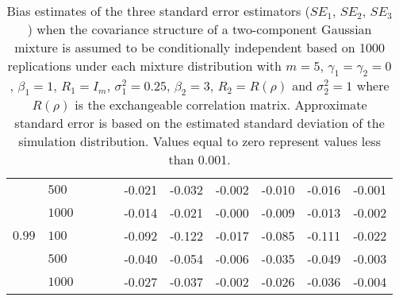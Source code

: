 \documentclass[10pt]{article}
\begin{document}
\begin{table}[ht]
\begin{center}
\begin{tabular}{llccccccccc}
    & $500$ &   &   &   & -0.021 & -0.032 & -0.002 & -0.010 & -0.016 & -0.001 \\ 
    & $1000$ &   &   &   & -0.014 & -0.021 & -0.000 & -0.009 & -0.013 & -0.002 \\ 
  $0.99$ & $100$ &   &   &   & -0.092 & -0.122 & -0.017 & -0.085 & -0.111 & -0.022 \\ 
    & $500$ &   &   &   & -0.040 & -0.054 & -0.006 & -0.035 & -0.049 & -0.003 \\ 
    & $1000$ &   &   &   & -0.027 & -0.037 & -0.002 & -0.026 & -0.036 & -0.004 \\ 
   \hline\end{tabular}
\caption{Bias estimates of the three standard error estimators ($SE_1$, $SE_2$, $SE_3$) when the covariance structure of a two-component Gaussian mixture is assumed to be conditionally independent based on 1000 replications under each mixture distribution with $m=5$, $\gamma_1=\gamma_2=0$, $\beta_{1}=1$, $R_1=I_{m}$, $\sigma_1^{2}=0.25$, $\beta_2=3$, $R_2=R(\rho)$ and $\sigma_2^{2}=1$ where $R(\rho)$ is the exchangeable correlation matrix. Approximate standard error is based on the estimated standard deviation of the simulation distribution. Values equal to zero represent values less than 0.001.}
\label{tab:dep2}
\end{center}
\end{table}\clearpage
\end{document}
